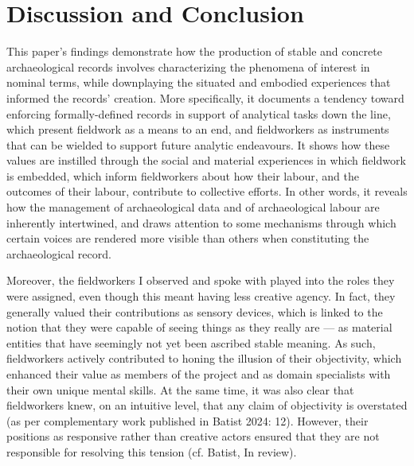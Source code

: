 \documentclass[
]{article}
\begin{document}
\section{Discussion and Conclusion}\label{discussion-and-conclusion}

This paper's findings demonstrate how the production of stable and
concrete archaeological records involves characterizing the phenomena of
interest in nominal terms, while downplaying the situated and embodied
experiences that informed the records' creation. More specifically, it
documents a tendency toward enforcing formally-defined records in
support of analytical tasks down the line, which present fieldwork as a
means to an end, and fieldworkers as instruments that can be wielded to
support future analytic endeavours. It shows how these values are
instilled through the social and material experiences in which fieldwork
is embedded, which inform fieldworkers about how their labour, and the
outcomes of their labour, contribute to collective efforts. In other
words, it reveals how the management of archaeological data and of
archaeological labour are inherently intertwined, and draws attention to
some mechanisms through which certain voices are rendered more visible
than others when constituting the archaeological record.

Moreover, the fieldworkers I observed and spoke with played into the
roles they were assigned, even though this meant having less creative
agency. In fact, they generally valued their contributions as sensory
devices, which is linked to the notion that they were capable of seeing
things as they really are --- as material entities that have seemingly
not yet been ascribed stable meaning. As such, fieldworkers actively
contributed to honing the illusion of their objectivity, which enhanced
their value as members of the project and as domain specialists with
their own unique mental skills. At the same time, it was also clear that
fieldworkers knew, on an intuitive level, that any claim of objectivity
is overstated (as per complementary work published in Batist 2024: 12).
However, their positions as responsive rather than creative actors
ensured that they are not responsible for resolving this tension (cf.
Batist, In review).
\end{document}
